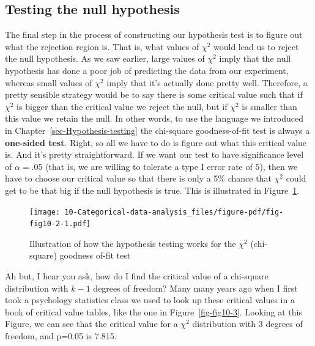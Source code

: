 \documentclass[
  a4paper,
]{book}
\begin{document}
\hypertarget{testing-the-null-hypothesis}{%
\subsection{Testing the null
hypothesis}\label{testing-the-null-hypothesis}}

The final step in the process of constructing our hypothesis test is to
figure out what the rejection region is. That is, what values of
\(\chi^2\) would lead us to reject the null hypothesis. As we saw
earlier, large values of \(\chi^2\) imply that the null hypothesis has
done a poor job of predicting the data from our experiment, whereas
small values of \(\chi^2\) imply that it's actually done pretty well.
Therefore, a pretty sensible strategy would be to say there is some
critical value such that if \(\chi^2\) is bigger than the critical value
we reject the null, but if \(\chi^2\) is smaller than this value we
retain the null. In other words, to use the language we introduced in
Chapter~\ref{sec-Hypothesis-testing} the chi-square goodness-of-fit test
is always a \textbf{one-sided test}. Right, so all we have to do is
figure out what this critical value is. And it's pretty straightforward.
If we want our test to have significance level of \(\alpha = .05\) (that
is, we are willing to tolerate a type I error rate of \(5%
\)), then we have to choose our critical value so that there is only a
5\% chance that \(\chi^2\) could get to be that big if the null
hypothesis is true. This is illustrated in Figure~\ref{fig-fig10-2}.

\begin{figure}

\texttt{[image: 10-Categorical-data-analysis\_files/figure-pdf/fig-fig10-2-1.pdf]} \hfill{}

\caption{\label{fig-fig10-2}Illustration of how the hypothesis testing
works for the \(\chi^2\) (chi-square) goodness of-fit test}

\end{figure}

Ah but, I hear you ask, how do I find the critical value of a chi-square
distribution with \(k-1\) degrees of freedom? Many many years ago when I
first took a psychology statistics class we used to look up these
critical values in a book of critical value tables, like the one in
Figure~\ref{fig-fig10-3}. Looking at this Figure, we can see that the
critical value for a \(\chi^2\) distribution with 3 degrees of freedom,
and p=0.05 is 7.815.
\end{document}

